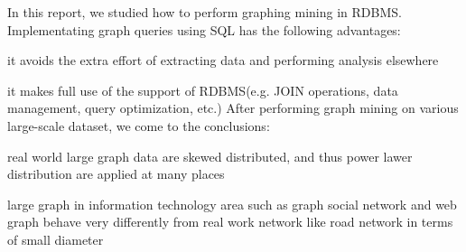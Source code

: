 In this report, we studied how to perform graphing mining in RDBMS.
Implementating graph queries using SQL has the following advantages:
\bit
\item it avoids the extra effort of extracting data and performing analysis elsewhere
\item it makes full use of the support of RDBMS(e.g. JOIN operations, data management, query optimization, etc.)
\eit
After performing graph mining on various large-scale dataset, we come to the conclusions: 
\bit
\item real world large graph data are skewed distributed, and thus power lawer distribution are applied at many places
\item large graph in information technology area such as graph social network and web graph behave very differently from real work network like road network in terms of small diameter
\eit